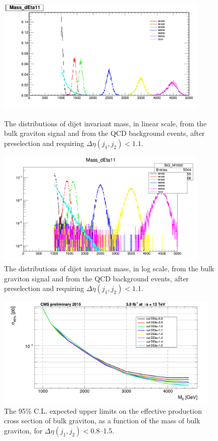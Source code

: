 \begin{figure}[htbp]
   \centering
   \includegraphics[width=0.9\textwidth]{figures/optimization/deta/Mjj_opt_11.png}
   \caption{The distributions of dijet invariant mass, in linear scale, 
     from the bulk graviton signal and from the QCD background events, after
     preselection and requiring $\Delta \eta (j_1,j_2) < 1.1$. }
   \label{fig:detaMOne}
   \includegraphics[width=0.9\textwidth]{figures/optimization/deta/log_Mjj_opt_11.png}
   \caption{The distributions of dijet invariant mass, in log scale, 
     from the bulk graviton signal and from the QCD background events, after
     preselection and requiring $\Delta \eta (j_1,j_2) < 1.1$. }
   \label{fig:detaMTwo}
\end{figure}



\begin{figure}[htbp]
   \centering
   \includegraphics[width=0.95\textwidth]{figures/optimization/deta/shape1.png}
   \caption{The 95\% C.L. expected upper limits on the effective production cross 
     section of bulk graviton, as a function of the mass of 
     bulk graviton, for $\Delta \eta (j_1,j_2)<$0.8--1.5.}
   \label{fig:detalimit}
\end{figure}


